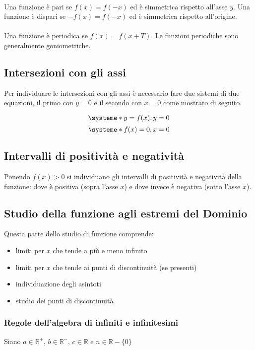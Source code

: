 \documentclass[a4paper,14pt]{extarticle}
\newcommand{\R}{\mathbb{R}}
\begin{document}
\paragraph{}
Una funzione è pari se $f(x) = f(-x)$ ed è simmetrica rispetto all'asse $y$. Una funzione è dispari se $-f(x) = f(-x)$ ed è simmetrica rispetto all'origine.
\paragraph{}
Una funzione è periodica se $f(x) = f(x + T)$. Le funzioni periodiche sono generalmente goniometriche.

\subsection{Intersezioni con gli assi}
Per individuare le intersezioni con gli assi è necessario fare due sistemi di due equazioni, il primo con $y = 0$ e il secondo con $x = 0$ come mostrato di seguito.

\[
\systeme*{y = f(x),y = 0}
\]
\[
\systeme*{f(x) = 0,x = 0}
\]

\subsection{Intervalli di positività e negatività}
Ponendo $f(x) > 0$ si individuano gli intervalli di positività e negatività della funzione: dove è positiva (sopra l'asse $x$) e dove invece è negativa (sotto l'asse $x$).
\subsection{Studio della funzione agli estremi del Dominio}
Questa parte dello studio di funzione comprende:
\begin{itemize}
    \item limiti per $x$ che tende a più e meno infinito
    \item limiti per $x$ che tende ai punti di discontinuità (se presenti)
    \item individuazione degli asintoti
    \item studio dei punti di discontinuità
\end{itemize}

\subsubsection{Regole dell'algebra di infiniti e infinitesimi}
Siano $a \in\R^+$, $b \in\R^-$, $c \in\R$ e $n \in\R-\{0\}$
\end{document}
